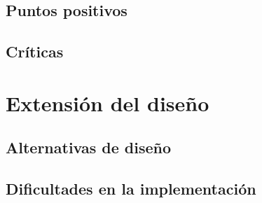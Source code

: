 \documentclass[a4paper,11pt]{article}
\begin{document}
\subsection{Puntos positivos}

\subsection{Críticas}

\section{Extensión del diseño}

\subsection{Alternativas de diseño}

\subsection{Dificultades en la implementación}
\end{document}
